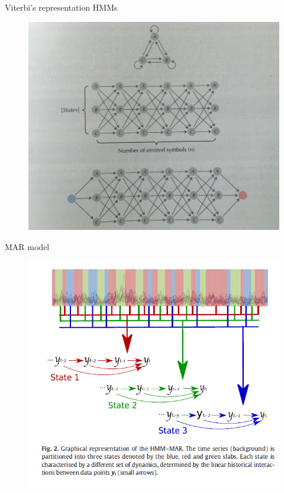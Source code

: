 \documentclass{beamer}
\begin{document}
	\begin{frame}{Viterbi's representation HMMs}
		\begin{figure}[h]
			\centering
				\includegraphics[scale=0.6]{../Figures/fig_hmm.png}
		\end{figure}
	\end{frame}

	\begin{frame}{MAR model}
	
	
	\begin{figure}[h]
		\centering
			\includegraphics[scale=0.5]{../Figures/fig_vidaurre2_2.png}
	\end{figure}
\end{frame}
	
\end{document}
